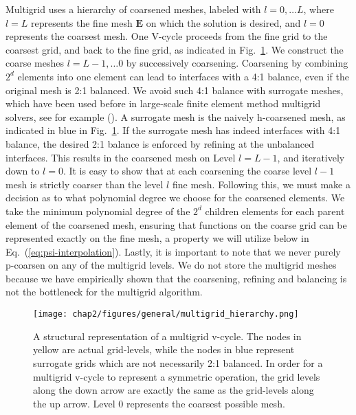 Multigrid uses a hierarchy of coarsened meshes, labeled with
$l=0, \ldots L$, where $l=L$
represents the fine mesh $\mathbf{E}$ on which the solution is
desired, and $l=0$ represents the coarsest mesh.  One V-cycle proceeds
from the fine grid to the coarsest grid, and back to the fine grid, as
indicated in Fig.~\ref{fig:vcycle}.  We construct the coarse meshes
$l=L-1, \ldots 0$ by successively coarsening. Coarsening by
  combining $2^d$ elements into one element can lead to interfaces
  with a 4:1 balance, even if the original mesh is 2:1 balanced.  We
  avoid such 4:1 balance with
surrogate meshes, which have been used before in large-scale finite element method
multigrid solvers, see for example
(\citet*{sampath2008dendro,sundar2012parallel}).  A surrogate mesh is the
naively h-coarsened mesh, as indicated in blue in
Fig.~\ref{fig:vcycle}.  If the surrogate mesh has indeed interfaces
with 4:1 balance, the desired 2:1 balance is enforced by refining at
the unbalanced interfaces.  This results in the coarsened mesh on
Level $l=L-1$, and iteratively down to $l=0$.  It is easy to show that
at each coarsening the coarse level $l-1$ mesh is strictly
coarser than the level $l$ fine mesh.  Following this, we must make a decision as to what
polynomial degree we choose for the coarsened elements. We take the minimum polynomial degree of the $2^{d}$
children elements for each parent element of the coarsened mesh, ensuring that functions on the coarse grid can be represented exactly on the fine mesh, a property we will utilize below in Eq.~(\ref{eq:psi-interpolation}). Lastly, it is important to note that we never purely p-coarsen on any of the multigrid levels.
We do not store the multigrid meshes
because we have empirically shown that the coarsening, refining and
balancing is not the bottleneck for the multigrid algorithm.

%
%
\usetikzlibrary{arrows,positioning} 
\begin{figure}[ht!]
  \centering
\texttt{[image: chap2/figures/general/multigrid\_hierarchy.png]}
\caption{
  \label{fig:vcycle}
  A structural representation of a multigrid v-cycle. The nodes in yellow are actual grid-levels, while the nodes in blue represent surrogate grids which are not necessarily 2:1 balanced. In order for a multigrid v-cycle to represent a symmetric operation, the grid levels along the down arrow are exactly the same as the grid-levels along the up arrow. Level 0 represents the coarsest possible mesh.} 
\end{figure}

